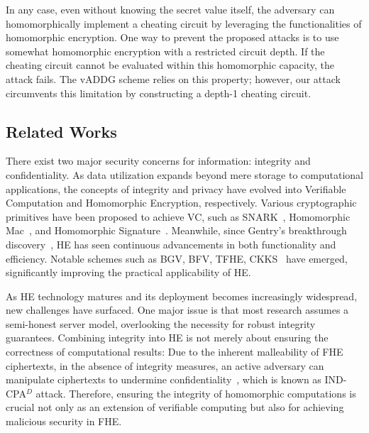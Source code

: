 \documentclass[runningheads]{llncs}
\begin{document}
In any case, even without knowing the secret value itself, the adversary can homomorphically implement a cheating circuit by leveraging the functionalities of homomorphic encryption. One way to prevent the proposed attacks is to use somewhat homomorphic encryption with a restricted circuit depth. If the cheating circuit cannot be evaluated within this homomorphic capacity, the attack fails. The vADDG scheme relies on this property; however, our attack circumvents this limitation by constructing a depth-1 cheating circuit.

    \subsection{Related Works}
    There exist two major security concerns for information: integrity and confidentiality. As data utilization expands beyond mere storage to computational applications, the concepts of integrity and privacy have evolved into Verifiable Computation and Homomorphic Encryption, respectively.
    Various cryptographic primitives have been proposed to achieve VC, such as SNARK~\cite{SoK}, Homomorphic Mac~\cite{HomMAc1, Hommac2}, and Homomorphic Signature~\cite{HomomorphicSignautre}. Meanwhile, since Gentry's breakthrough discovery~\cite{Gen09}, HE has seen continuous advancements in both functionality and efficiency. Notable schemes such as BGV, BFV, TFHE, CKKS~\cite{BGV,bfv,CGGI,CKKS} have emerged, significantly improving the practical applicability of HE. 
    
    As HE technology matures and its deployment becomes increasingly widespread, new challenges have surfaced. One major issue is that most research assumes a semi-honest server model, overlooking the necessity for robust integrity guarantees.
    Combining integrity into HE is not merely about ensuring the correctness of computational results: Due to the inherent malleability of FHE ciphertexts, in the absence of integrity measures, an active adversary can manipulate ciphertexts to undermine confidentiality~\cite{INDCPAD, INDCPAD1}, which is known as IND-CPA$^D$ attack. Therefore, ensuring the integrity of homomorphic computations is crucial not only as an extension of verifiable computing but also for achieving malicious security in FHE.
\end{document}
